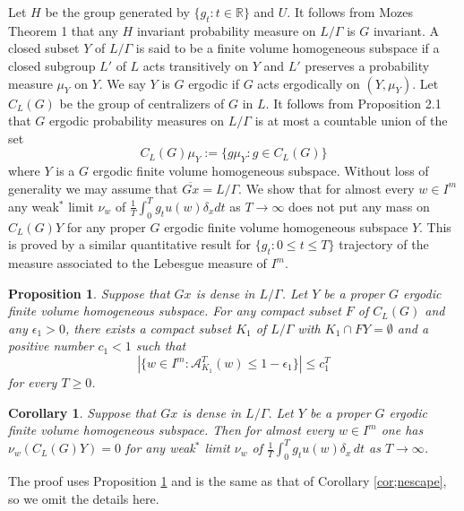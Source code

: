 \documentclass[12pt]{amsart}
\newtheorem{cor}[thm]{Corollary}
\newtheorem{prop}[thm]{Proposition}
\theoremstyle{definition}
\theoremstyle{remark}
\numberwithin{equation}{section}
\begin{document}
Let $H$ be the group generated by $\{g_t :t\in \mathbb R\} $ and $U$. It follows from 
Mozes \cite{m95} Theorem 1 that any $H$ invariant probability measure on $L/\Gamma$ is
$G$ invariant. 
A closed subset $Y$ of $L/\Gamma$ is said to be a finite volume homogeneous subspace 
if  a closed subgroup $L'$ of $L$ acts transitively on $Y$ and $L'$ preserves a probability 
measure $\mu_Y$ on $Y$. We say $Y$ is $G$ ergodic if $G$ acts ergodically on 
$(Y, \mu_Y)$.
Let $C_L(G)$ be the group of centralizers of $G$ in $L$.
It follows from  \cite{bq132} Proposition 2.1 that $G$ ergodic probability measures on $L/\Gamma$
 is at most a countable union of the set  
 \[
 C_L(G)\mu_Y:=\{g\mu_Y: g\in C_L(G)\}
 \]  where  $Y $ is a $G$ ergodic finite volume homogeneous subspace. 
 Without loss of generality we may assume that $\overline{Gx}=L/\Gamma$. 
We show that for almost every $w\in I^m$ any weak$^*$ limit $\nu_w$ 
 of 
$\frac{1}{T}\int_0^T g_tu(w)\delta_{x} dt$ as $T\to \infty $
 does not 
put any mass on 
$C_L(G)Y$ for any proper $G$ ergodic  finite volume homogeneous  subspace $Y$.
 This is  proved by  a similar quantitative result
for $\{g_t: 0\le t\le T\}$ trajectory of the measure associated to the  Lebesgue measure of $I^m$.
\begin{prop}\label{prop;singular}
Suppose that $Gx$ is dense in $L/\Gamma$. 
Let $Y$ be a proper $G$ ergodic finite volume homogeneous subspace. 
For any  compact subset  $F$ of $C_L(G)$ and any $ \epsilon_1 >0$, there exists a 
compact subset $K_1$ of $L/\Gamma$
with $K_1\cap FY=\emptyset$
 and a positive number  $c_1<1$ such that 
 \begin{equation*}
\left |\{w\in I^m: \mathcal A_{K_1}^T(w)\le 1- \epsilon_1   \}\right |\le  c_1^T
 \end{equation*}
 for every $T\ge 0$.
\end{prop}
\begin{cor}\label{cor;nobad}
Suppose that $Gx$ is dense in $L/\Gamma$.  
Let $Y$ be a proper $G$ ergodic finite volume homogeneous subspace. 
Then for almost every $w\in I^m$ one has $\nu_w(C_L(G)Y)=0$ for 
any
 weak$^*$ limit $\nu_w$ of $\frac{1}{T}\int_0^T g_tu(w)\delta_x\,dt$
 as $T\to \infty $.
\end{cor}
The proof  uses Proposition \ref{prop;singular} and  is the same as that of Corollary \ref{cor;nescape}, so we 
omit the details here. 
\end{document}
